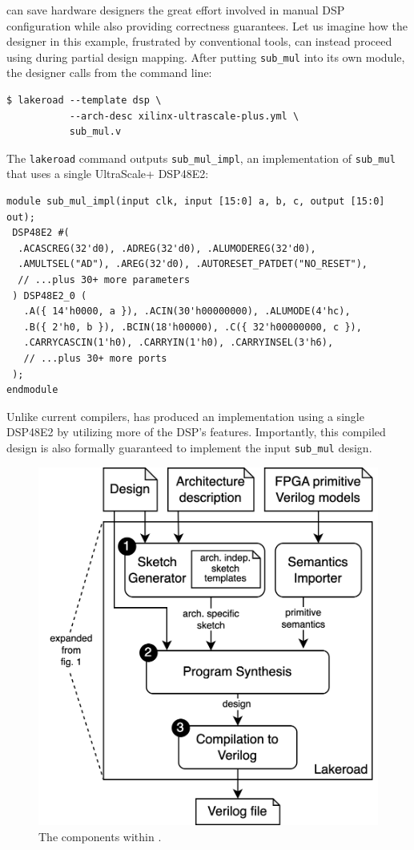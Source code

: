 \lr can save hardware designers
  the great effort involved
  in manual DSP configuration
  while also providing correctness guarantees.
Let us imagine how the designer 
  in this example,
  frustrated by conventional tools,
  can instead proceed using \lr
  during partial design mapping.
After putting 
  \texttt{sub\_mul}
  into its own module,
  the designer calls
  \lr from the command line:
\begin{verbatim}
$ lakeroad --template dsp \
           --arch-desc xilinx-ultrascale-plus.yml \
           sub_mul.v
\end{verbatim}
The \texttt{lakeroad} command outputs
  \texttt{sub\_mul\_impl},
  an implementation
  of \texttt{sub\_mul}
  that uses a single UltraScale+ DSP48E2:
\begin{verbatim}
module sub_mul_impl(input clk, input [15:0] a, b, c, output [15:0] out);
 DSP48E2 #(
  .ACASCREG(32'd0), .ADREG(32'd0), .ALUMODEREG(32'd0),
  .AMULTSEL("AD"), .AREG(32'd0), .AUTORESET_PATDET("NO_RESET"), 
  // ...plus 30+ more parameters
 ) DSP48E2_0 (
   .A({ 14'h0000, a }), .ACIN(30'h00000000), .ALUMODE(4'hc),
   .B({ 2'h0, b }), .BCIN(18'h00000), .C({ 32'h00000000, c }),
   .CARRYCASCIN(1'h0), .CARRYIN(1'h0), .CARRYINSEL(3'h6),
   // ...plus 30+ more ports
 );
endmodule
\end{verbatim}
%
Unlike current compilers,
  \lr has produced an implementation
  using a single DSP48E2
  by utilizing more of the DSP's features.
Importantly, this compiled design
  is also formally guaranteed
  to implement
  the input \texttt{sub\_mul}
  design.
  
\begin{figure}
    \centering
    \hspace{-1cm}%
    \includegraphics[width=.5\columnwidth]{lakeroad/assets/lakeroad-diagram.drawio.png}
   \caption{The components within \lr.}
    \label{fig:lakeroad-diagram}
\end{figure}

